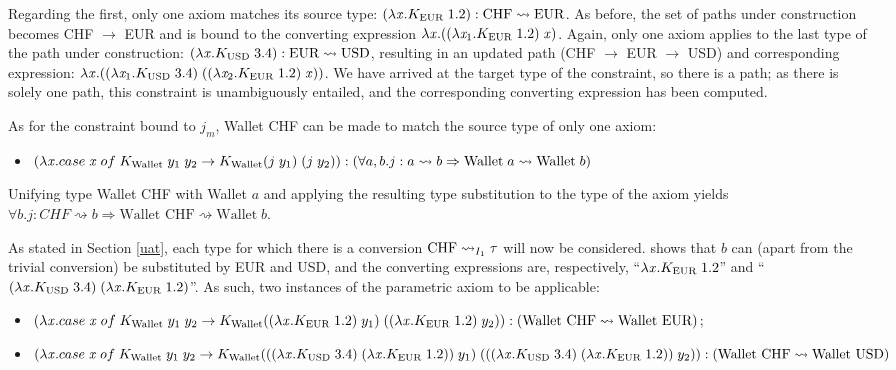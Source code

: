 Regarding the first, only one axiom matches its source type: $(\lambda \tmVar . K_{\text{EUR}}\; 1.2) : {\text{CHF}} \rightsquigarrow {\text{EUR}}$. As before, the set of paths under construction becomes CHF $\to$ EUR and is bound to the converting expression $\lambda \tmVar . ((\lambda \tmVar_1 . K_{\text{EUR}}\; 1.2)\; \tmVar)$. Again, only one axiom applies to the last type of the path under construction: ${(\lambda \tmVar . K_{\text{USD}}\; 3.4)} : {\text{EUR}} \rightsquigarrow {\text{USD}}$, resulting in an updated path (CHF $\to$ EUR $\to$ USD) and corresponding expression: $\lambda \tmVar . (({\lambda \tmVar_1 . K_{\text{USD}}\; 3.4})\;((\lambda \tmVar_2 . K_{\text{EUR}}\; 1.2)\;\tmVar))$. We have arrived at the target type of the constraint, so there is a path; as there is solely one path, this constraint is unambiguously entailed, and the corresponding converting expression has been computed.

As for the constraint bound to $j_m$, Wallet CHF can be made to match the source type of only one axiom:
\begin{itemize}
\item$(\lambda \tmVar. case\;\tmVar\; of\;K_{\text{Wallet}}\;y_1\;y_2 \to K_{\text{Wallet}} (j\;y_1)\;(j\;y_2)) : (\forall a, b . j : a \rightsquigarrow b \Rightarrow \text{Wallet}\;a\rightsquigarrow \text{Wallet}\;b)$
\end{itemize}
Unifying type Wallet CHF with Wallet $a$ and applying the resulting type substitution to the type of the axiom yields $\forall b . j : CHF \rightsquigarrow b \Rightarrow \text{Wallet CHF}\rightsquigarrow \text{Wallet}\;b$.

As stated in Section \ref{uat}, each type for which there is a conversion $\convX{\imEnv_1}{\text{CHF}}{\type}$ will now be considered.  shows that $b$ can (apart from the trivial conversion) be substituted by EUR and USD, and the converting expressions are, respectively, ``$\lambda \tmVar . K_{\text{EUR}}\; 1.2$'' and ``$(\lambda \tmVar . K_{\text{USD}}\; 3.4)\;(\lambda \tmVar . K_{\text{EUR}}\; 1.2)$''. As such, two instances of the parametric axiom to be applicable:
\begin{itemize}
  \item $(\lambda \tmVar. case\;\tmVar\; of\;K_{\text{Wallet}}\;y_1\;y_2 \to \\ K_{\text{Wallet}} ((\lambda \tmVar . K_{\text{EUR}}\; 1.2)\;y_1)\;((\lambda \tmVar . K_{\text{EUR}}\; 1.2)\;y_2))\\  : (\text{Wallet CHF}\rightsquigarrow \text{Wallet EUR})$;

  \item $(\lambda \tmVar. case\;\tmVar\; of\;K_{\text{Wallet}}\;y_1\;y_2  \to \\ K_{\text{Wallet}} (((\lambda \tmVar . K_{\text{USD}}\; 3.4)\;(\lambda \tmVar . K_{\text{EUR}}\; 1.2))\;y_1)\;(((\lambda \tmVar . K_{\text{USD}}\; 3.4)\;(\lambda \tmVar . K_{\text{EUR}}\; 1.2))\;y_2)) \\ : (\text{Wallet CHF}\rightsquigarrow \text{Wallet USD})$
\end{itemize}

